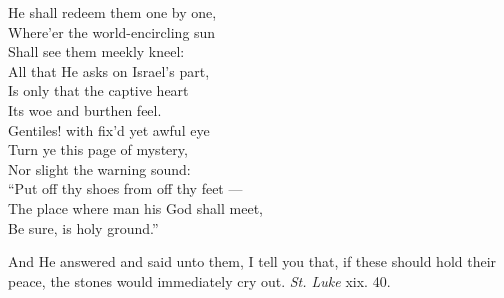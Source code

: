   He shall redeem them one by one, \\
 Where’er the world-encircling sun \\
 Shall see them meekly kneel: \\
 All that He asks on Israel’s part, \\
 Is only that the captive heart \\
 Its woe and burthen feel. \\
  Gentiles! with fix’d yet awful eye \\
 Turn ye this page of mystery, \\
 Nor slight the warning sound: \\
 “Put off thy shoes from off thy feet — \\
 The place where man his God shall meet, \\
 Be sure, is holy ground.”\\


And He answered and said unto them, I tell you that, if these should hold their peace, the stones would immediately cry out. \emph{St. Luke} xix. 40.

